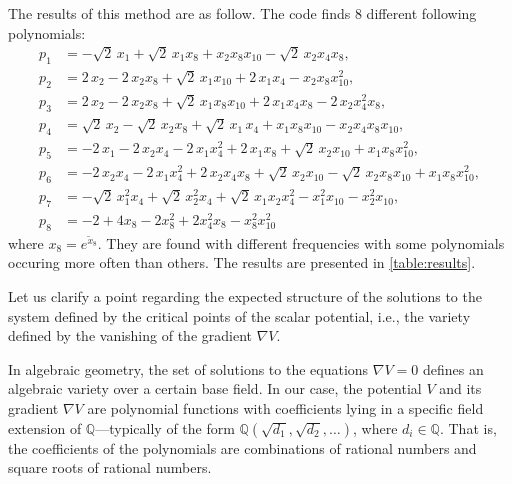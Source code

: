 \documentclass[11pt]{article}
\begin{document}
	The results of this method are as follow. The code finds 8 different following polynomials: 
	\begin{subequations} \label{eq:pols}
    \begin{align}
      p_{1} &= -\sqrt{2}\,x_{1} + \sqrt{2}\,x_{1}x_8 + x_{2}x_8x_{10} - \sqrt{2}\,x_{2}x_{4}x_8,\\
      p_{2} &= 2\,x_{2} - 2\,x_{2}x_8 + \sqrt{2}\,x_{1}x_{10} + 2\,x_{1}x_{4} - x_{2}x_8x_{10}^{2},\\
      p_{3} &= 2\,x_{2} - 2\,x_{2}x_8 + \sqrt{2}\,x_{1}x_8x_{10} + 2\,x_{1}x_{4}x_8
      		- 2\,x_{2} x_{4}^{2}x_8,\\
      p_{4} &= \sqrt{2}\,x_{2} - \sqrt{2}\,x_{2}x_8 + \sqrt{2}\,x_{1}\,x_{4} + x_{1}x_8x_{10}
      		- x_{2}x_{4}x_8x_{10},\\
      p_{5} &= -2\,x_{1} - 2\,x_{2}x_{4}- 2\,x_{1}x_{4}^{2} + 2\,x_{1}x_8 + \sqrt{2}\,x_{2}x_{10}
      		+ x_{1}x_8x_{10}^{2},\\
      p_{6} &= -2\,x_{2}x_{4} - 2\,x_{1}x_{4}^{2} + 2\,x_{2}x_{4}x_8 + \sqrt{2}\,x_{2}x_{10} 
      		- \sqrt{2}\,x_{2}x_8x_{10} +  x_{1}x_8x_{10}^{2},\\
      p_{7} &= -\sqrt{2}\,x_{1}^{2}x_{4} + \sqrt{2}\,x_{2}^{2}x_{4} + \sqrt{2}\,x_{1}x_{2}x_{4}^{2} - x_{1}^{2}x_{10}
      		- x_{2}^{2}x_{10}, \\
      p_{8} &= -2 + 4 x_{8} - 2 x_8^2 + 2 x_{4}^2 x_8 - x_8^2 x_{10}^2
    \end{align}
  \end{subequations}
  where $x_{8} = e^{\tilde{x}_{8}}$. They are found with different frequencies with some polynomials occuring more often than others. The results are presented in \eqref{table:results}.
  
  	Let us clarify a point regarding the expected structure of the solutions to the system defined by the critical points of the scalar potential, i.e., the variety defined by the vanishing of the gradient $\nabla V$.
  
  In algebraic geometry, the set of solutions to the equations $\nabla V = 0$ defines an algebraic variety over a certain base field. In our case, the potential $V$ and its gradient $\nabla V$ are polynomial functions with coefficients lying in a specific field extension of $\mathbb{Q}$—typically of the form $\mathbb{Q}(\sqrt{d_1}, \sqrt{d_2}, \dots)$, where $d_i \in \mathbb{Q}$. That is, the coefficients of the polynomials are combinations of rational numbers and square roots of rational numbers.
  
\end{document}
